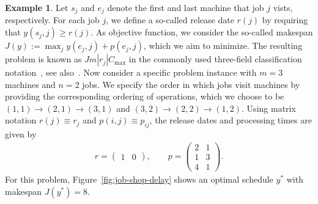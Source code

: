 \documentclass[a4paper]{report}
\theoremstyle{definition}
\newtheorem{eg}{Example}[chapter]
\theoremstyle{plain}
\begin{document}
\begin{eg}\label{eg:job-shop}
  Let $s_{j}$ and $e_{j}$ denote the first and last machine that job $j$ vists, respectively.
  For each job $j$, we define a so-called release date $r(j)$ by requiring that
  $y(s_{j},j) \geq r(j)$.
  As objective function, we consider the so-called makespan
  $J(y) := \max_{j} y(e_{j},j) + p(e_{j}, j)$, which we aim to minimize.
  The resulting problem is known as $Jm|r_{j}|C_{\max}$ in the commonly used
  three-field classification notation~\cite{grahamOptimizationApproximationDeterministic1979}, see also~\cite[Chapter
  2]{pinedoSchedulingTheoryAlgorithms2016}.
  Now consider a specific problem instance with $m=3$ machines and $n=2$ jobs.
  We specify the order in which jobs visit machines by providing the
  corresponding ordering of operations, which we choose to be
  $(1,1) \rightarrow (2,1) \rightarrow (3,1)$ and $(3,2) \rightarrow (2,2) \rightarrow (1,2)$. Using matrix notation
  $r(j) \equiv r_{j}$ and $p(i,j) \equiv p_{ij}$, the release dates and processing
  times are given by
  \begin{align*}
    r =
    \begin{pmatrix}
      1 & 0
    \end{pmatrix} ,
    \quad\quad
    p =
    \begin{pmatrix}
      2 & 1 \\
      1 & 3 \\
      4 & 1
    \end{pmatrix} .
  \end{align*}
  For this problem, Figure~\ref{fig:job-shop-delay} shows an optimal schedule $y^{*}$ with
  makespan $J(y^{*}) = 8$.
\end{eg}
\end{document}
